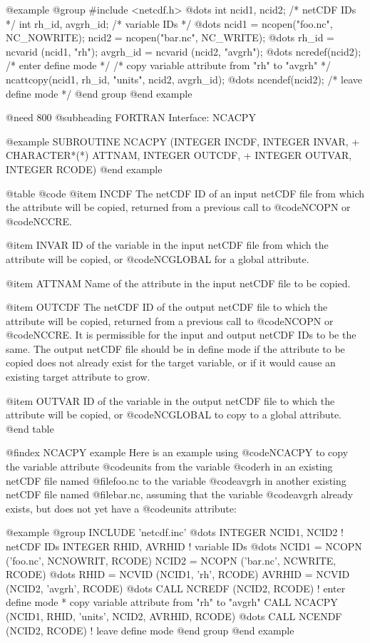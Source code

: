 {@example
@group
#include <netcdf.h>
   @dots{}
int  ncid1, ncid2;       /* netCDF IDs */
int  rh_id, avgrh_id;      /* variable IDs */
   @dots{}
ncid1 = ncopen("foo.nc", NC_NOWRITE);
ncid2 = ncopen("bar.nc", NC_WRITE);
   @dots{}
rh_id = ncvarid (ncid1, "rh");
avgrh_id = ncvarid (ncid2, "avgrh");
   @dots{}
ncredef(ncid2);           /* enter define mode */
/* copy variable attribute from "rh" to "avgrh" */
ncattcopy(ncid1, rh_id, "units", ncid2, avgrh_id);
   @dots{}
ncendef(ncid2);           /* leave define mode */
@end group
@end example

@need 800
@subheading FORTRAN Interface:  NCACPY

@example
      SUBROUTINE NCACPY (INTEGER INCDF, INTEGER INVAR,
     +                   CHARACTER*(*) ATTNAM, INTEGER OUTCDF,
     +                   INTEGER OUTVAR, INTEGER RCODE)
@end example

@table @code
@item INCDF
The netCDF ID of an input netCDF file from which the attribute will be copied,
returned from a previous call to @code{NCOPN} or @code{NCCRE}.

@item INVAR
ID of the variable in the input netCDF file from which the
attribute will be copied, or @code{NCGLOBAL} for a global attribute.

@item ATTNAM
Name of the attribute in the input netCDF file to be copied.

@item OUTCDF
The netCDF ID of the output netCDF file to which the attribute will be copied,
returned from a previous call to @code{NCOPN} or @code{NCCRE}.  It
is permissible for the input and output netCDF IDs to be the same.  The
output netCDF file should be in define mode if the attribute to be
copied does not already exist for the target variable, or if it would
cause an existing target attribute to grow.

@item OUTVAR
ID of the variable in the output netCDF file to which the
attribute will be copied, or @code{NCGLOBAL} to copy to a global
attribute.
@end table

@findex NCACPY example
Here is an example using @code{NCACPY} to copy the variable attribute
@code{units} from the variable @code{rh} in an existing netCDF file
named @file{foo.nc} to the variable @code{avgrh} in another existing
netCDF file named @file{bar.nc}, assuming that the variable
@code{avgrh} already exists, but does not yet have a @code{units}
attribute:

@example
@group
      INCLUDE 'netcdf.inc'
         @dots{}
      INTEGER  NCID1, NCID2     ! netCDF IDs
      INTEGER  RHID, AVRHID       ! variable IDs
         @dots{}
      NCID1 = NCOPN ('foo.nc', NCNOWRIT, RCODE)
      NCID2 = NCOPN ('bar.nc', NCWRITE, RCODE)
         @dots{}
      RHID = NCVID (NCID1, 'rh', RCODE)
      AVRHID = NCVID (NCID2, 'avgrh', RCODE)
         @dots{}
      CALL NCREDF (NCID2, RCODE)  ! enter define mode
* copy variable attribute from "rh" to "avgrh"
      CALL NCACPY (NCID1, RHID, 'units', NCID2, AVRHID, RCODE)
         @dots{}
      CALL NCENDF (NCID2, RCODE)  ! leave define mode
@end group
@end example

}
